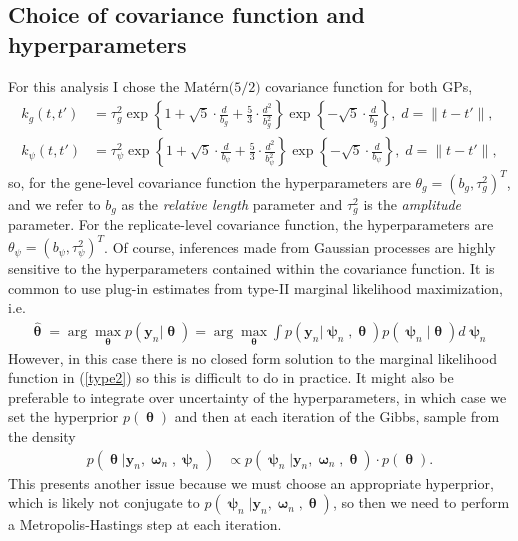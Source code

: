\documentclass[11pt]{article}
\newcommand{\1}{\mathbf{1}}
\newcommand{\0}{\mathbf{0}}
\newcommand{\y}{\mathbf{y}}
\begin{document}
\subsection{Choice of covariance function and hyperparameters}
%
%
%
For this analysis I chose the $\text{Mat\'{e}rn(5/2)}$ covariance function for both GPs,
%
%
\begin{align*}
	k_g(t, t') &= \tau_g^2 \exp\left\{ 1 + \sqrt{5} \cdot \frac{d}{b_g} + \frac{5}{3} \cdot \frac{d^2}{b_g^2} \right\} \exp \left\{ -\sqrt{5} \cdot \frac{d}{b_g} \right \} , \; d = \|t - t' \|, \\
	k_\psi(t, t') &= \tau_\psi^2 \exp\left\{ 1 + \sqrt{5} \cdot \frac{d}{b_\psi} + \frac{5}{3} \cdot \frac{d^2}{b_\psi^2} \right\} \exp \left\{ -\sqrt{5} \cdot \frac{d}{b_\psi} \right \} , \; d = \|t - t' \|,
\end{align*}
%
%
so, for the gene-level covariance function the hyperparameters are $\theta_g = (b_g, \tau_g^2)^T$, and we refer to $b_g$ as the \emph{relative length} parameter and $\tau_g^2$ is the \emph{amplitude} parameter. For the replicate-level covariance function, the hyperparameters are $\theta_\psi = (b_\psi, \tau_\psi^2)^T$. Of course, inferences made from Gaussian processes are highly sensitive to the hyperparameters contained within the covariance function. It is common to use plug-in estimates from type-II marginal likelihood maximization, i.e.
%
%
%
\begin{align}
	\hat{\bm{\uptheta}} = \arg \max_{\bm{\uptheta}} p(\y_n | \bm{\uptheta}) = \arg \max_{\bm{\uptheta}} \int p(\y_n | \bm{\uppsi}_n, \bm{\uptheta}) p(\bm{\uppsi}_n| \bm{\uptheta}) d \bm{\uppsi}_n \label{type2}
\end{align}
%
%
%
However, in this case there is no closed form solution to the marginal likelihood function in (\ref{type2}) so this is difficult to do in practice. It might also be preferable to integrate over uncertainty of the hyperparameters, in which case we set the hyperprior $p(\bm{\uptheta})$ and then at each iteration of the Gibbs, sample from the density
%
%
%
\begin{align*}
	p( \bm{\uptheta} | \y_{n}, \bm{\upomega}_{n}, \bm{\uppsi}_{n}) &\propto p(\bm{\uppsi}_{n} | \y_{n}, \bm{\upomega}_{n}, \bm{\uptheta}) \cdot p(\bm{\uptheta}).
\end{align*}
%
%
%
This presents another issue because we must choose an appropriate hyperprior, which is likely not conjugate to $p(\bm{\uppsi}_{n} | \y_{n}, \bm{\upomega}_{n}, \bm{\uptheta})$, so then we need to perform a Metropolis-Hastings step at each iteration. 
\end{document}
